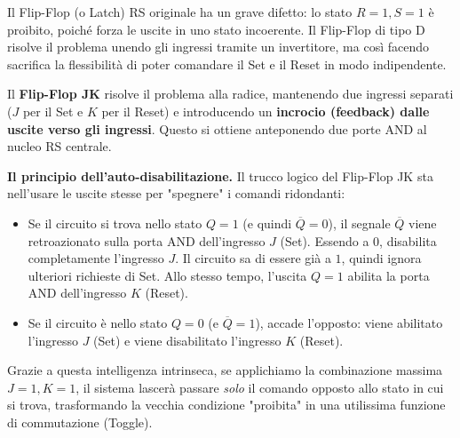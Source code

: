 Il Flip-Flop (o Latch) RS originale ha un grave difetto: lo stato $R=1, S=1$ è proibito, poiché forza le uscite in uno stato incoerente. Il Flip-Flop di tipo D risolve il problema unendo gli ingressi tramite un invertitore, ma così facendo sacrifica la flessibilità di poter comandare il Set e il Reset in modo indipendente.

Il \textbf{Flip-Flop JK} risolve il problema alla radice, mantenendo due ingressi separati ($J$ per il Set e $K$ per il Reset) e introducendo un \textbf{incrocio (feedback) dalle uscite verso gli ingressi}. Questo si ottiene anteponendo due porte AND al nucleo RS centrale.

\medskip
\noindent\textbf{Il principio dell'auto-disabilitazione.}
Il trucco logico del Flip-Flop JK sta nell'usare le uscite stesse per "spegnere" i comandi ridondanti:
\begin{itemize}[leftmargin=1.5em]
    \item Se il circuito si trova nello stato $Q=1$ (e quindi $\overline{Q}=0$), il segnale $\overline{Q}$ viene retroazionato sulla porta AND dell'ingresso $J$ (Set). Essendo a $0$, disabilita completamente l'ingresso $J$. Il circuito sa di essere già a $1$, quindi ignora ulteriori richieste di Set. Allo stesso tempo, l'uscita $Q=1$ abilita la porta AND dell'ingresso $K$ (Reset).
    \item Se il circuito è nello stato $Q=0$ (e $\overline{Q}=1$), accade l'opposto: viene abilitato l'ingresso $J$ (Set) e viene disabilitato l'ingresso $K$ (Reset).
\end{itemize}
Grazie a questa intelligenza intrinseca, se applichiamo la combinazione massima $J=1, K=1$, il sistema lascerà passare \emph{solo} il comando opposto allo stato in cui si trova, trasformando la vecchia condizione "proibita" in una utilissima funzione di commutazione (Toggle).

